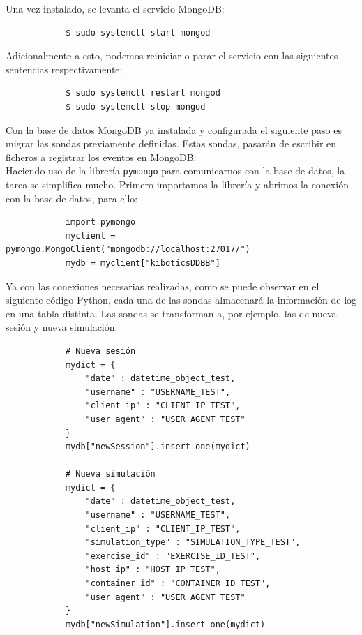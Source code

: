 \documentclass[a4paper, 12pt]{book}
\begin{document}
		Una vez instalado, se levanta el servicio MongoDB:
		
		{\footnotesize
		\begin{verbatim}
			$ sudo systemctl start mongod
		\end{verbatim}
		}
	
		Adicionalmente a esto, podemos reiniciar o parar el servicio con las siguientes sentencias respectivamente:
		
		{\footnotesize
		\begin{verbatim}
			$ sudo systemctl restart mongod
			$ sudo systemctl stop mongod
		\end{verbatim}
		}
	
		Con la base de datos MongoDB ya instalada y configurada el siguiente paso es migrar las sondas previamente definidas. Estas sondas, pasarán de escribir en ficheros a registrar los eventos en MongoDB. \\
		
		Haciendo uso de la librería \texttt{pymongo} para comunicarnos con la base de datos, la tarea se simplifica mucho. Primero importamos la librería y abrimos la conexión con la base de datos, para ello: 
		
		{\footnotesize
		\begin{verbatim}
			import pymongo
			myclient = pymongo.MongoClient("mongodb://localhost:27017/")
			mydb = myclient["kiboticsDDBB"]
		\end{verbatim}
		}
	
		Ya con las conexiones necesarias realizadas, como se puede observar en el siguiente código Python, cada una de las sondas almacenará la información de log en una tabla distinta. Las sondas se transforman a, por ejemplo, las de nueva sesión y nueva simulación:
		
		{\footnotesize
		\begin{verbatim}
			# Nueva sesión
			mydict = {
			    "date" : datetime_object_test, 
			    "username" : "USERNAME_TEST", 
			    "client_ip" : "CLIENT_IP_TEST", 
			    "user_agent" : "USER_AGENT_TEST"
			}
			mydb["newSession"].insert_one(mydict)
			
			# Nueva simulación
			mydict = {
			    "date" : datetime_object_test, 
			    "username" : "USERNAME_TEST", 
			    "client_ip" : "CLIENT_IP_TEST", 
			    "simulation_type" : "SIMULATION_TYPE_TEST",
			    "exercise_id" : "EXERCISE_ID_TEST",
			    "host_ip" : "HOST_IP_TEST",
			    "container_id" : "CONTAINER_ID_TEST",
			    "user_agent" : "USER_AGENT_TEST"
			}
			mydb["newSimulation"].insert_one(mydict)
		\end{verbatim}
		}
		
\end{document}
